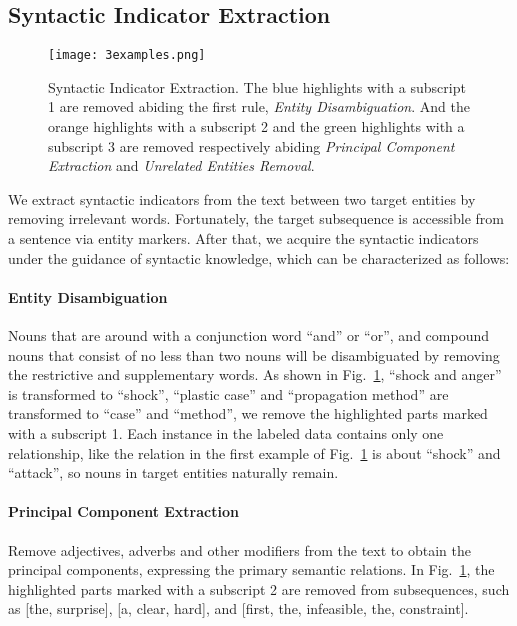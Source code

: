 \documentclass[conference]{IEEEtran}
\begin{document}
\subsection{Syntactic Indicator Extraction}

\begin{figure}[ht]
\centerline{\texttt{[image: 3examples.png]}}
\caption{Syntactic Indicator Extraction. The blue highlights with a subscript 1 are removed abiding the first rule, {\em Entity Disambiguation}. And the orange highlights with a subscript 2 and the green highlights with a subscript 3 are removed respectively abiding {\em Principal Component Extraction} and {\em Unrelated Entities Removal}.}
\label{fig:3examples}
\end{figure}

We extract syntactic indicators from the text between two target entities by removing irrelevant words. Fortunately, the target subsequence is accessible from a sentence via entity markers. After that, we acquire the syntactic indicators under the guidance of syntactic knowledge, which can be characterized as follows:

\paragraph{Entity Disambiguation}
Nouns that are around with a conjunction word “and” or “or”, and compound nouns that consist of no less than two nouns will be disambiguated by removing the restrictive and supplementary words. As shown in Fig.~\ref{fig:3examples}, “shock and anger” is transformed to “shock”, “plastic case” and “propagation method” are transformed to “case” and “method”, we remove the highlighted parts marked with a subscript 1. Each instance in the labeled data contains only one relationship, like the relation in the first example of Fig.~\ref{fig:3examples} is about “shock” and “attack”, so nouns in target entities naturally remain.

\paragraph{Principal Component Extraction} 
Remove adjectives, adverbs and other modifiers from the text to obtain the principal components, expressing the primary semantic relations. In Fig.~\ref{fig:3examples}, the highlighted parts marked with a subscript 2 are removed from subsequences, such as [the, surprise], [a, clear, hard], and [first, the, infeasible, the, constraint].
\end{document}
